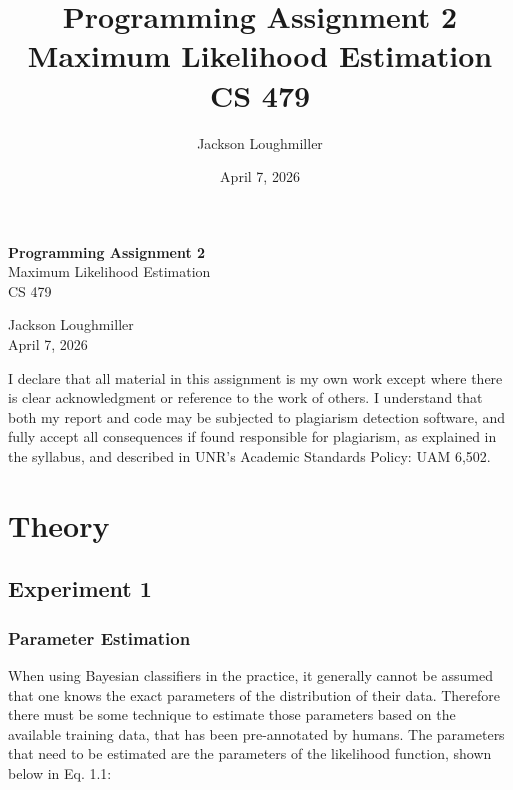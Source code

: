 \documentclass{article}
\title{Programming Assignment 2 \\ \large Maximum Likelihood Estimation \\ CS 479}
\author{Jackson Loughmiller}
\date{April 7, 2026}
\begin{document}
\begin{titlepage}
    \centering
    \vspace*{\fill}
    
    {\huge \textbf{Programming Assignment 2}} \\
    \vspace{0.5cm}
    {\Large Maximum Likelihood Estimation} \\
    \vspace{0.5cm}
    {\large CS 479}
    
    \vspace{2cm}
    
    {\large Jackson Loughmiller} \\
    \vspace{0.2cm}
    {\large April 7, 2026}
    
    \vspace{3cm}
    
    \noindent I declare that all material in this assignment is my own work except
    where there is clear acknowledgment or reference to the work of others.
    I understand that both my report and code may be subjected to plagiarism
    detection software, and fully accept all consequences if found
    responsible for plagiarism, as explained in the syllabus, and described
    in UNR's Academic Standards Policy: UAM 6,502.
    
    \vspace*{\fill}
\end{titlepage}

\newpage

\section{Theory}\label{theory}

\subsection{Experiment 1}\label{experiment-1}

\subsubsection*{Parameter Estimation}\label{parameter-estimation}

When using Bayesian classifiers in the practice, it generally cannot be
assumed that one knows the exact parameters of the distribution of their
data. Therefore there must be some technique to estimate those
parameters based on the available training data, that has been
pre-annotated by humans. The parameters that need to be estimated are
the parameters of the likelihood function, shown below in Eq. 1.1:
\end{document}
